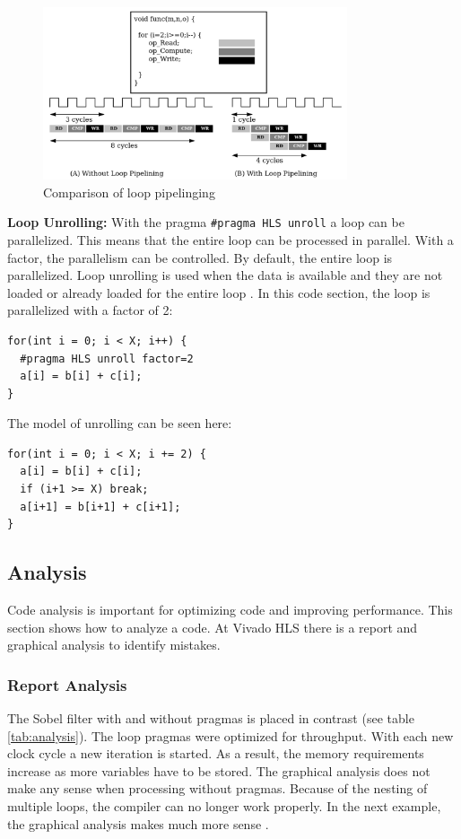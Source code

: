 \begin{figure}[h!]
    \centering
    \includegraphics[width=0.8\textwidth]{images/image_processing/pipelining.png}
    \caption{Comparison of loop pipelinging \cite{pragma}}
    \label{fig:pipelining}
\end{figure}

\clearpage
\textbf{Loop Unrolling:} With the pragma \texttt{\#pragma HLS unroll} a loop can be parallelized. This means that the entire loop can be processed in parallel. With a factor, the parallelism can be controlled. By default, the entire loop is parallelized. 
Loop unrolling is used when the data is available and they are not loaded or already loaded for the entire loop \cite{pragma}. 
In this code section, the loop is parallelized with a factor of 2:

\begin{lstlisting}[style=CStyle , caption=Loop unrolling with a factor of 2 \cite{pragma}]
for(int i = 0; i < X; i++) {
  #pragma HLS unroll factor=2
  a[i] = b[i] + c[i];
}
\end{lstlisting}

The model of unrolling can be seen here:
\begin{lstlisting}[style=CStyle , caption=Loop unrolling with a factor of 2 \cite{pragma}]
for(int i = 0; i < X; i += 2) {
  a[i] = b[i] + c[i];
  if (i+1 >= X) break;
  a[i+1] = b[i+1] + c[i+1];
}
\end{lstlisting}


\subsection{Analysis}
Code analysis is important for optimizing code and improving performance. This section shows how to analyze a code. At Vivado HLS there is a report and graphical analysis to identify mistakes. 

\subsubsection*{Report Analysis}
The Sobel filter with and without pragmas is placed in contrast (see table \ref{tab:analysis}). The loop pragmas were optimized for throughput. With each new clock cycle a new iteration is started. As a result, the memory requirements increase as more variables have to be stored. 
The graphical analysis does not make any sense when processing without pragmas. Because of the nesting of multiple loops, the compiler can no longer work properly. In the next example, the graphical analysis makes much more sense .\\

